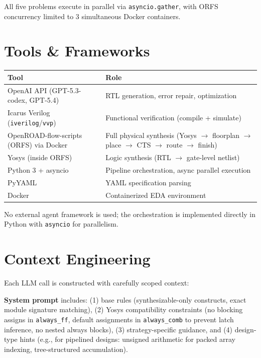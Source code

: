 \documentclass[10pt]{article}
\begin{document}
All five problems execute in parallel via \texttt{asyncio.gather}, with ORFS concurrency limited to 3 simultaneous Docker containers.

\section{Tools \& Frameworks}

\begin{table}[h]
\centering
\small
\begin{tabularx}{\textwidth}{lX}
\toprule
\textbf{Tool} & \textbf{Role} \\
\midrule
OpenAI API (GPT-5.3-codex, GPT-5.4) & RTL generation, error repair, optimization \\
Icarus Verilog (\texttt{iverilog}/\texttt{vvp}) & Functional verification (compile + simulate) \\
OpenROAD-flow-scripts (ORFS) via Docker & Full physical synthesis (Yosys $\to$ floorplan $\to$ place $\to$ CTS $\to$ route $\to$ finish) \\
Yosys (inside ORFS) & Logic synthesis (RTL $\to$ gate-level netlist) \\
Python 3 + asyncio & Pipeline orchestration, async parallel execution \\
PyYAML & YAML specification parsing \\
Docker & Containerized EDA environment \\
\bottomrule
\end{tabularx}
\end{table}

No external agent framework is used; the orchestration is implemented directly in Python with \texttt{asyncio} for parallelism.

\section{Context Engineering}

Each LLM call is constructed with carefully scoped context:

\textbf{System prompt} includes: (1) base rules (synthesizable-only constructs, exact module signature matching), (2) Yosys compatibility constraints (no blocking assigns in \texttt{always\_ff}, default assignments in \texttt{always\_comb} to prevent latch inference, no nested always blocks), (3) strategy-specific guidance, and (4) design-type hints (e.g., for pipelined designs: unsigned arithmetic for packed array indexing, tree-structured accumulation).
\end{document}
